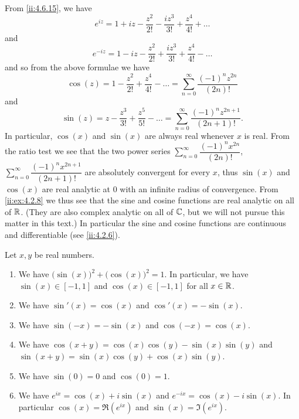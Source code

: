\begin{ac}\label{ii:ac:4.7.1}
  From \cref{ii:4.6.15}, we have
  \[
    e^{i z} = 1 + i z - \dfrac{z^2}{2!} - \dfrac{i z^3}{3!} + \dfrac{z^4}{4!} + \dots
  \]
  and
  \[
    e^{- i z} = 1 - i z - \dfrac{z^2}{2!} + \dfrac{i z^3}{3!} + \dfrac{z^4}{4!} - \dots
  \]
  and so from the above formulae we have
  \[
    \cos(z) = 1 - \dfrac{z^2}{2!} + \dfrac{z^4}{4!} - \dots = \sum_{n = 0}^\infty \dfrac{(-1)^n z^{2n}}{(2n)!}
  \]
  and
  \[
    \sin(z) = z - \dfrac{z^3}{3!} + \dfrac{z^5}{5!} - \dots = \sum_{n = 0}^\infty \dfrac{(-1)^n z^{2n + 1}}{(2n + 1)!}.
  \]
  In particular, \(\cos(x)\) and \(\sin(x)\) are always real whenever \(x\) is real.
  From the ratio test we see that the two power series \(\sum_{n = 0}^\infty \dfrac{(-1)^n x^{2n}}{(2n)!}\), \(\sum_{n = 0}^\infty \dfrac{(-1)^n x^{2n + 1}}{(2n + 1)!}\) are absolutely convergent for every \(x\), thus \(\sin(x)\) and \(\cos(x)\) are real analytic at \(0\) with an infinite radius of convergence.
  From \cref{ii:ex:4.2.8} we thus see that the sine and cosine functions are real analytic on all of \(\mathbb{R}\).
  (They are also complex analytic on all of \(\mathbb{C}\), but we will not pursue this matter in this text.)
  In particular the sine and cosine functions are continuous and differentiable (see \cref{ii:4.2.6}).
\end{ac}

\begin{thm}\label{ii:4.7.2}
  Let \(x, y\) be real numbers.
  \begin{enumerate}
    \item We have \(\big(\sin(x)\big)^2 + \big(\cos(x)\big)^2 = 1\).
          In particular, we have \(\sin(x) \in [-1, 1]\) and \(\cos(x) \in [-1, 1]\) for all \(x \in \mathbb{R}\).
    \item We have \(\sin'(x) = \cos(x)\) and \(\cos'(x) = -\sin(x)\).
    \item We have \(\sin(-x) = -\sin(x)\) and \(\cos(-x) = \cos(x)\).
    \item We have \(\cos(x + y) = \cos(x) \cos(y) - \sin(x) \sin(y)\) and \(\sin(x + y) = \sin(x) \cos(y) + \cos(x) \sin(y)\).
    \item We have \(\sin(0) = 0\) and \(\cos(0) = 1\).
    \item We have \(e^{i x} = \cos(x) + i \sin(x)\) and \(e^{- i x} = \cos(x) - i \sin(x)\).
          In particular \(\cos(x) = \Re(e^{i x})\) and \(\sin(x) = \Im(e^{i x})\).
  \end{enumerate}
\end{thm}

